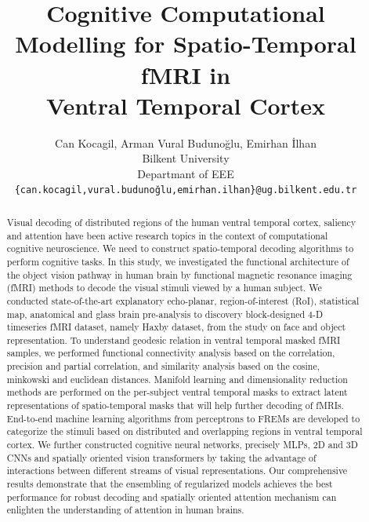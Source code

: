 \documentclass[10pt, twocolumn, letterpaper]{article}
\begin{document}
\title{Cognitive Computational Modelling for Spatio-Temporal fMRI in \\ Ventral Temporal Cortex}

\author{Can Kocagil, Arman Vural Budunoğlu, Emirhan İlhan\\
Bilkent University\\
Departmant of EEE\\
{\tt\small \{can.kocagil,vural.budunoğlu,emirhan.ilhan\}@ug.bilkent.edu.tr}

}




\maketitle
\thispagestyle{plain}
\pagestyle{plain}


\begin{abstract}

Visual decoding of distributed regions of the human ventral temporal cortex, saliency and attention have been active research topics in the context of computational cognitive neuroscience. We need to construct spatio-temporal decoding algorithms to perform cognitive tasks. In this study, we investigated the functional architecture of the object vision pathway in human brain by functional magnetic resonance imaging (fMRI) methods to decode the visual stimuli viewed by a human subject. We conducted state-of-the-art explanatory echo-planar, region-of-interest (RoI), statistical map, anatomical and glass brain pre-analysis to discovery block-designed 4-D timeseries fMRI dataset, namely Haxby dataset, from the study on face and object representation. To understand geodesic relation in ventral temporal masked fMRI samples, we performed functional connectivity analysis based on the correlation, precision and partial correlation, and similarity analysis based on the cosine, minkowski and euclidean distances. Manifold learning and dimensionality reduction methods are performed on the per-subject ventral temporal masks to extract latent representations of spatio-temporal masks that will help further decoding of fMRIs. End-to-end machine learning algorithms from perceptrons to FREMs are developed to categorize the stimuli based on distributed and overlapping regions in ventral temporal cortex. We further constructed cognitive neural networks, precisely MLPs, 2D and 3D  CNNs and spatially oriented vision transformers by taking the advantage of interactions between different streams of visual representations. Our comprehensive results demonstrate that the ensembling of regularized models achieves the best performance for robust decoding and spatially oriented attention mechanism can enlighten the understanding of attention in human brains.   
\end{abstract}
\end{document}
